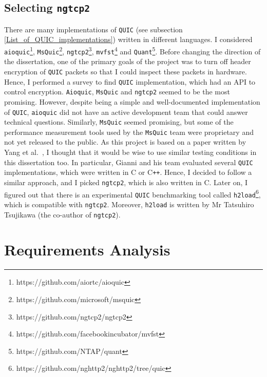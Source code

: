 \documentclass[12pt,a4paper,twoside,openright]{report}
\begin{document}
\subsection{Selecting  \texttt{ngtcp2}}
There are many implementations of \texttt{QUIC} (see subsection \ref{List_of_QUIC_implementations}) written in different languages.
I considered  \texttt{aioquic}\footnote{https://github.com/aiortc/aioquic},  \texttt{MsQuic}\footnote{https://github.com/microsoft/msquic},  \texttt{ngtcp2}\footnote{https://github.com/ngtcp2/ngtcp2},  \texttt{mvfst}\footnote{https://github.com/facebookincubator/mvfst} and \texttt{Quant}\footnote{https://github.com/NTAP/quant}.
Before changing the direction of the dissertation, one of the primary goals of the project was to turn off header encryption of \texttt{QUIC} packets so that I could inspect these packets in hardware.
Hence, I performed a survey to find \texttt{QUIC} implementation, which had an API to control encryption. 
\texttt{Aioquic}, \texttt{MsQuic} and \texttt{ngtcp2} seemed to be the most promising.
However, despite being a simple and well-documented implementation of \texttt{QUIC}, \texttt{aioquic} did not have an active development team that could answer technical questions.
Similarly, \texttt{MsQuic} seemed promising, but some of the performance measurement tools used by the \texttt{MsQuic} team were proprietary and not yet released to the public.
As this project is based on a paper written by Yang et al.~\cite{Making_QUIC_Quicker}, I thought that it would be wise to use similar testing conditions in this dissertation too.
In particular, Gianni and his team evaluated several \texttt{QUIC} implementations, which were written in C or C\texttt{++}.
Hence, I decided to follow a similar approach, and I picked \texttt{ngtcp2}, which is also written in C.
Later on, I figured out that there is an experimental \texttt{QUIC} benchmarking tool called \texttt{h2load}\footnote{https://github.com/nghttp2/nghttp2/tree/quic}, which is compatible with \texttt{ngtcp2}.
Moreover, \texttt{h2load} is written by Mr Tatsuhiro  Tsujikawa (the co-author of \texttt{ngtcp2}).


\section{Requirements Analysis}
\end{document}
